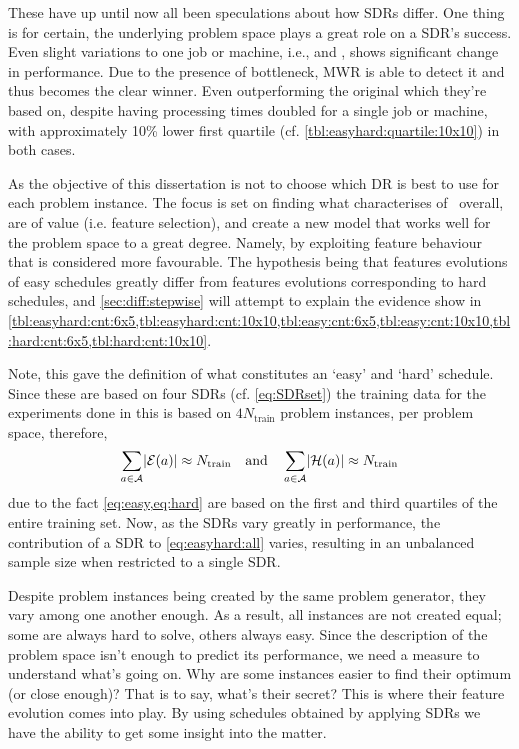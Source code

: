 These have up until now all been speculations about how SDRs differ. One thing 
is for certain, the underlying problem space plays a great role on a SDR's 
success. Even slight variations to one job or machine, i.e.,  and 
, shows significant change in performance. Due to the presence of 
bottleneck, MWR is able to detect it and thus becomes the clear winner. Even 
outperforming the original  which they're based on, despite having 
processing times doubled for a single job or machine, with approximately 10\% 
lower first quartile (cf. \cref{tbl:easyhard:quartile:10x10}) in both cases. 

As the objective of this dissertation is not to choose which DR is best to use for each problem instance. 
The focus is set on finding what characterises of \jsp\ overall, are of value (i.e. feature selection), and create a new model that works well for the problem space to a great degree.
Namely, by exploiting feature behaviour that is considered more favourable. The hypothesis being that features evolutions of easy schedules greatly differ from features evolutions corresponding to hard schedules, and \cref{sec:diff:stepwise} will attempt to explain the evidence show in \cref{tbl:easyhard:cnt:6x5,tbl:easyhard:cnt:10x10,tbl:easy:cnt:6x5,tbl:easy:cnt:10x10,tbl:hard:cnt:6x5,tbl:hard:cnt:10x10}.

Note, this  gave the definition of what 
constitutes an `easy' and `hard' schedule. Since these are based on four SDRs 
(cf. \cref{eq:SDRset}) the training data for the experiments done in this 
 is based on $4N_{\text{train}}$ problem 
instances, per problem space, therefore,
\begin{equation}\label{eq:easyhard:all}
  \sum_{a\in\mathcal{A}}\abs{\mathcal{E}(a)} \approx N_{\text{train}}
  \quad\text{and}\quad
  \sum_{a\in\mathcal{A}}\abs{\mathcal{H}(a)} \approx N_{\text{train}}
\end{equation} 
due to the fact \cref{eq:easy,eq:hard} are based on the first and third 
quartiles of the entire training set.
Now, as the SDRs vary greatly in performance, the contribution of a SDR to \cref{eq:easyhard:all} varies, resulting in an unbalanced sample size when restricted to a single SDR. 



Despite problem instances being created by the same problem generator, they 
vary among one another enough. As a result, all instances are not created 
equal; some are always hard to solve, others always easy. 
Since the description of the problem space isn't enough to predict its performance, we need a measure to understand what's going on. Why are some instances easier to find their optimum (or close enough)? That is to say, what's their secret? This is where their feature evolution comes into play.
By using schedules obtained by applying SDRs we have the ability to get some insight into the matter. 

